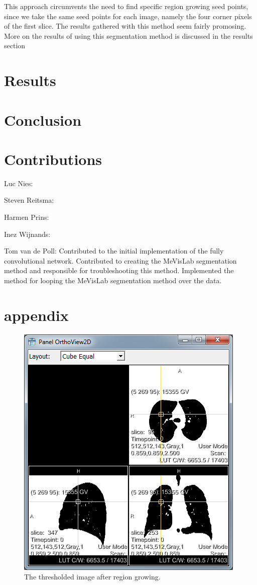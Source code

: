 \documentclass[a4paper,10pt]{article}
\numberwithin{equation}{section} %
\numberwithin{figure}{section} %
\numberwithin{table}{section} %
\begin{document}
This approach circumvents the need to find specific region growing seed points, since we take the same seed points for each image, namely the four corner pixels of the first slice. The results gathered with this method seem fairly promosing. More on the results of using this segmentation method is discussed in the results section


\section{Results}

\section{Conclusion}

\section{Contributions}

Luc Nies:

Steven Reitsma:

Harmen Prins:

Inez Wijnands:

Tom van de Poll: Contributed to the initial implementation of the fully convolutional network. Contributed to creating the MeVisLab segmentation method and responsible for troubleshooting this method. Implemented the method for looping the MeVisLab segmentation method over the data.\\

\section{appendix}
\begin{figure}[h]
	\centering
	\includegraphics[scale=0.7]{regiongrowing}
    \caption{The thresholded image after region growing.}
    \label{fig:reg-gro}
\end{figure}
\end{document}
